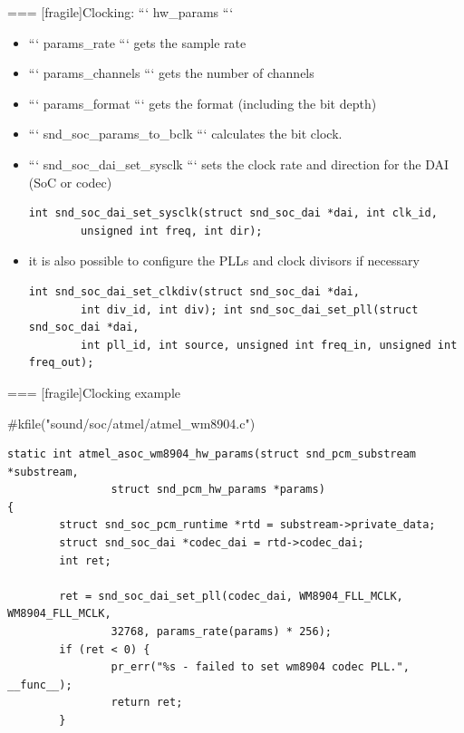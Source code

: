 === [fragile]{Clocking: ``` hw_params ```}
  \begin{itemize}
  \item ``` params_rate ``` gets the sample rate
  \item ``` params_channels ``` gets the number of channels
  \item ``` params_format ``` gets the format (including the bit depth)
  \item ``` snd_soc_params_to_bclk ``` calculates the bit clock.
  \item ``` snd_soc_dai_set_sysclk ``` sets the clock rate and
    direction for the DAI (SoC or codec)
    \begin{block}{}
      \begin{verbatim}
int snd_soc_dai_set_sysclk(struct snd_soc_dai *dai, int clk_id,
        unsigned int freq, int dir);
      \end{verbatim}
    \end{block}
  \item it is also possible to configure the PLLs and clock divisors
    if necessary
    \begin{block}{}
      \fontsize{9}{9}\selectfont
      \begin{verbatim}
int snd_soc_dai_set_clkdiv(struct snd_soc_dai *dai,
        int div_id, int div); int snd_soc_dai_set_pll(struct snd_soc_dai *dai,
        int pll_id, int source, unsigned int freq_in, unsigned int freq_out);
      \end{verbatim}
    \end{block}
  \end{itemize}


=== [fragile]{Clocking example}
  \begin{block}{#kfile("sound/soc/atmel/atmel_wm8904.c")}
    \fontsize{9}{9}\selectfont
    \begin{verbatim}
static int atmel_asoc_wm8904_hw_params(struct snd_pcm_substream *substream,
                struct snd_pcm_hw_params *params)
{
        struct snd_soc_pcm_runtime *rtd = substream->private_data;
        struct snd_soc_dai *codec_dai = rtd->codec_dai;
        int ret;

        ret = snd_soc_dai_set_pll(codec_dai, WM8904_FLL_MCLK, WM8904_FLL_MCLK,
                32768, params_rate(params) * 256);
        if (ret < 0) {
                pr_err("%s - failed to set wm8904 codec PLL.", __func__);
                return ret;
        }
    \end{verbatim}
  \end{block}


